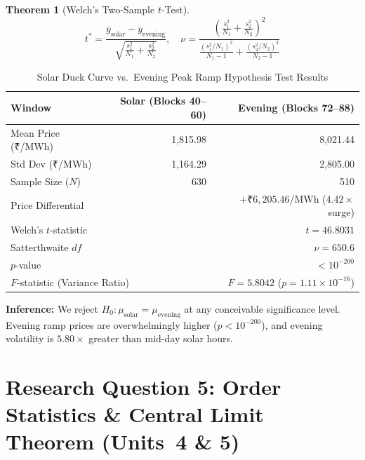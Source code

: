 \documentclass[12pt, a4paper]{article}
\theoremstyle{definition}
\newtheorem{theorem}{Theorem}[section]
\newcommand{\MWh}{\text{MWh}}
\begin{document}
\begin{theorem}[Welch's Two-Sample $t$-Test]
\begin{equation}
    t^* = \frac{\bar{y}_{\text{solar}} - \bar{y}_{\text{evening}}}{\sqrt{\frac{s_1^2}{N_1} + \frac{s_2^2}{N_2}}}, \quad \nu = \frac{\left(\frac{s_1^2}{N_1} + \frac{s_2^2}{N_2}\right)^2}{\frac{(s_1^2/N_1)^2}{N_1-1} + \frac{(s_2^2/N_2)^2}{N_2-1}}
\end{equation}
\end{theorem}

\begin{table}[H]
\centering
\caption{Solar Duck Curve vs.\ Evening Peak Ramp Hypothesis Test Results}
\label{tab:welch}
\begin{tabular}{l r r}
\toprule
\textbf{Window} & \textbf{Solar (Blocks 40--60)} & \textbf{Evening (Blocks 72--88)} \\
\midrule
Mean Price (₹/MWh) & 1,815.98 & 8,021.44 \\
Std Dev (₹/MWh) & 1,164.29 & 2,805.00 \\
Sample Size ($N$) & 630 & 510 \\
\midrule
\multicolumn{2}{l}{Price Differential} & $+\text{₹}6{,}205.46/\MWh$ ($4.42\times$ surge) \\
\multicolumn{2}{l}{Welch's $t$-statistic} & $t = 46.8031$ \\
\multicolumn{2}{l}{Satterthwaite $df$} & $\nu = 650.6$ \\
\multicolumn{2}{l}{$p$-value} & $< 10^{-200}$ \\
\multicolumn{2}{l}{$F$-statistic (Variance Ratio)} & $F = 5.8042$ ($p = 1.11 \times 10^{-16}$) \\
\bottomrule
\end{tabular}
\end{table}

\textbf{Inference:} We reject $H_0: \mu_{\text{solar}} = \mu_{\text{evening}}$ at any conceivable significance level. Evening ramp prices are overwhelmingly higher ($p < 10^{-200}$), and evening volatility is $5.80\times$ greater than mid-day solar hours.

\section{Research Question 5: Order Statistics \& Central Limit Theorem (Units~4 \& 5)}
\end{document}
